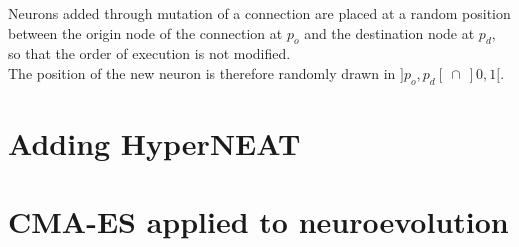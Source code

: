 Neurons added through mutation of a connection are placed at a random position between the origin node of the connection at $p_o$ and the destination node at $p_d$, so that the order of execution is not modified. \\
The position of the new neuron is therefore randomly drawn in $]p_o, p_d[ \: \cap \: ]0, 1[$.




\section{Adding HyperNEAT}

\section{CMA-ES applied to neuroevolution}

